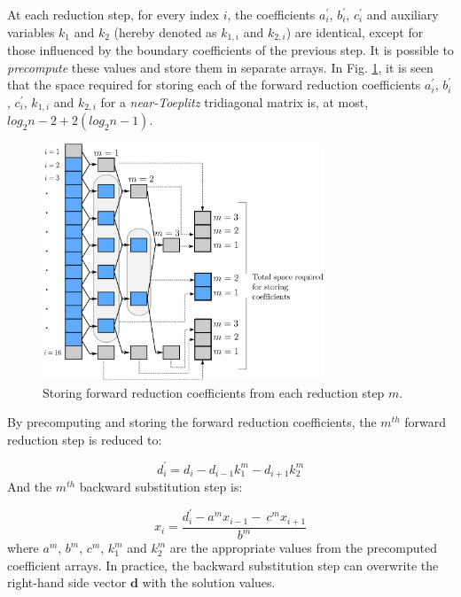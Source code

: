 \documentclass{elsarticle}
\begin{document}
At each reduction step,
for every index $i$,
the coefficients $a_i^\prime$, $b_i^\prime$, $c_i^\prime$
and auxiliary variables $k_1$ and $k_2$
(hereby denoted as $k_{1,i}$ and $k_{2,i}$) are identical,
except for those influenced by the
boundary coefficients of the previous step.
It is possible to \emph{precompute} these values
and store them in separate arrays.
In Fig. \ref{fig:cyclic-reduction-precomputing},
it is seen that the space required for storing each of the
forward reduction coefficients
$a_i^\prime$, $b_i^\prime$, $c_i^\prime$,
$k_{1,i}$ and $k_{2,i}$
for a \emph{near-Toeplitz} tridiagonal matrix
is, at most, $log_2n-2 + 2(log_2n-1)$.

\begin{figure}
\begin{center}
\includegraphics[height=200pt]{img/cyclic-reduction-precomputing.eps}
\end{center}
\caption{Storing forward reduction coefficients
    from each reduction step $m$.}
\label{fig:cyclic-reduction-precomputing}
\end{figure}

By precomputing and storing the forward reduction
coefficients,
the $m^{th}$ forward reduction step is reduced to:

\begin{equation}
d^{\prime}_i = d_i - d_{i-1}k_1^{m}  - d_{i+1}k_2^{m}
\label{eqn:precomputed-forward-reduction-step}
\end{equation}
%
And the $m^{th}$ backward substitution step is:

\begin{equation}
x_i = \frac{d^{\prime}_i - a^mx_{i-1} - \
    c^{m}x_{i+1}}{b^m}
\label{eqn:precomputed-backward-substitution-step}
\end{equation}
%
where $a^m$, $b^m$, $c^m$, $k_1^m$ and $k_2^m$
are the appropriate values
from the precomputed coefficient arrays.
In practice,
the backward substitution step
can overwrite the right-hand side vector $\bm{d}$
with the solution values.
\end{document}
